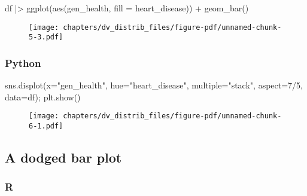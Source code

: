 \documentclass[
  letterpaper,
  DIV=11,
  numbers=noendperiod]{scrreprt}
\newenvironment{Shaded}{\begin{snugshade}}{\end{snugshade}}
\newcommand{\AttributeTok}[1]{\textcolor[rgb]{0.40,0.46,0.14}{#1}}
\newcommand{\DecValTok}[1]{\textcolor[rgb]{0.68,0.00,0.00}{#1}}
\newcommand{\FunctionTok}[1]{\textcolor[rgb]{0.28,0.35,0.67}{#1}}
\newcommand{\NormalTok}[1]{\textcolor[rgb]{0.00,0.46,0.62}{#1}}
\newcommand{\OperatorTok}[1]{\textcolor[rgb]{0.37,0.37,0.37}{#1}}
\newcommand{\SpecialCharTok}[1]{\textcolor[rgb]{0.37,0.37,0.37}{#1}}
\newcommand{\StringTok}[1]{\textcolor[rgb]{0.13,0.47,0.30}{#1}}
\begin{document}
\begin{Shaded}
\begin{Highlighting}[]
\NormalTok{df }\SpecialCharTok{|\textgreater{}} 
    \FunctionTok{ggplot}\NormalTok{(}\FunctionTok{aes}\NormalTok{(gen\_health, }\AttributeTok{fill =}\NormalTok{ heart\_disease)) }\SpecialCharTok{+}
    \FunctionTok{geom\_bar}\NormalTok{()}
\end{Highlighting}
\end{Shaded}

\begin{figure}[H]

{\centering \texttt{[image: chapters/dv\_distrib\_files/figure-pdf/unnamed-chunk-5-3.pdf]}

}

\end{figure}

\hypertarget{python-44}{%
\subsubsection{Python}\label{python-44}}

\begin{Shaded}
\begin{Highlighting}[]
\NormalTok{sns.displot(x}\OperatorTok{=}\StringTok{"gen\_health"}\NormalTok{, hue}\OperatorTok{=}\StringTok{"heart\_disease"}\NormalTok{, multiple}\OperatorTok{=}\StringTok{"stack"}\NormalTok{, aspect}\OperatorTok{=}\DecValTok{7}\OperatorTok{/}\DecValTok{5}\NormalTok{, data}\OperatorTok{=}\NormalTok{df)}\OperatorTok{;}
\NormalTok{plt.show()}
\end{Highlighting}
\end{Shaded}

\begin{figure}[H]

{\centering \texttt{[image: chapters/dv\_distrib\_files/figure-pdf/unnamed-chunk-6-1.pdf]}

}

\end{figure}

\hypertarget{a-dodged-bar-plot}{%
\subsection{A dodged bar plot}\label{a-dodged-bar-plot}}

\hypertarget{r-45}{%
\subsubsection{R}\label{r-45}}
\end{document}
